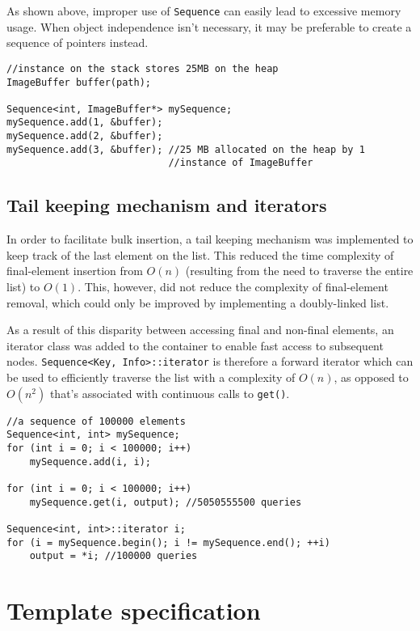 ﻿\documentclass{article}
\begin{document}
As shown above, improper use of {\tt Sequence} can easily lead to excessive
memory usage. When object independence isn't necessary, it may be preferable
to create a sequence of pointers instead.

\begin{verbatim}
//instance on the stack stores 25MB on the heap
ImageBuffer buffer(path);

Sequence<int, ImageBuffer*> mySequence;
mySequence.add(1, &buffer);
mySequence.add(2, &buffer);
mySequence.add(3, &buffer); //25 MB allocated on the heap by 1
                            //instance of ImageBuffer
\end{verbatim}

\subsection{Tail keeping mechanism and iterators}

In order to facilitate bulk insertion, a tail keeping mechanism was implemented
to keep track of the last element on the list. This reduced the time complexity
of final-element insertion from $O(n)$ (resulting from the need to traverse the
entire list) to $O(1)$. This, however, did not reduce the complexity of
final-element removal, which could only be improved by implementing a
doubly-linked list.

As a result of this disparity between accessing final and non-final elements,
an iterator class was added to the container to enable fast access to subsequent
nodes. {\tt Sequence<Key, Info>::iterator} is therefore a forward iterator
which can be used to efficiently traverse the list with a complexity of $O(n)$,
as opposed to $O(n^2)$ that's associated with continuous calls to {\tt get()}.

\begin{verbatim}
//a sequence of 100000 elements
Sequence<int, int> mySequence;
for (int i = 0; i < 100000; i++)
    mySequence.add(i, i);

for (int i = 0; i < 100000; i++)
    mySequence.get(i, output); //5050555500 queries

Sequence<int, int>::iterator i;
for (i = mySequence.begin(); i != mySequence.end(); ++i)
    output = *i; //100000 queries
\end{verbatim}

\section{Template specification}
\end{document}
